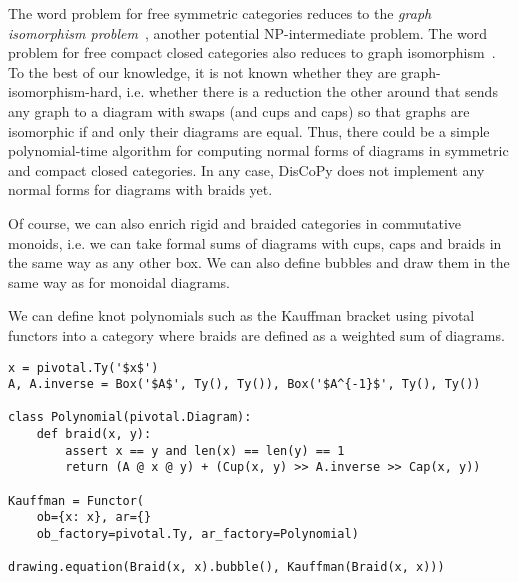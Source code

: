 The word problem for free symmetric categories reduces to the \emph{graph isomorphism problem}~\cite{PattersonEtAl21}, another potential NP-intermediate problem.
The word problem for free compact closed categories also reduces to graph isomorphism~\cite{Selinger07}.
To the best of our knowledge, it is not known whether they are graph-isomorphism-hard, i.e. whether there is a reduction the other around that sends any graph to a diagram with swaps (and cups and caps) so that graphs are isomorphic if and only their diagrams are equal.
Thus, there could be a simple polynomial-time algorithm for computing normal forms of diagrams in symmetric and compact closed categories.
In any case, DisCoPy does not implement any normal forms for diagrams with braids yet.

Of course, we can also enrich rigid and braided categories in commutative monoids, i.e. we can take formal sums of diagrams with cups, caps and braids in the same way as any other box.
We can also define bubbles and draw them in the same way as for monoidal diagrams.

\begin{example}
We can define knot polynomials such as the Kauffman bracket using pivotal functors into a category where braids are defined as a weighted sum of diagrams.

\begin{verbatim}
x = pivotal.Ty('$x$')
A, A.inverse = Box('$A$', Ty(), Ty()), Box('$A^{-1}$', Ty(), Ty())

class Polynomial(pivotal.Diagram):
    def braid(x, y):
        assert x == y and len(x) == len(y) == 1
        return (A @ x @ y) + (Cup(x, y) >> A.inverse >> Cap(x, y))

Kauffman = Functor(
    ob={x: x}, ar={}
    ob_factory=pivotal.Ty, ar_factory=Polynomial)

drawing.equation(Braid(x, x).bubble(), Kauffman(Braid(x, x)))
\end{verbatim}

\end{example}
